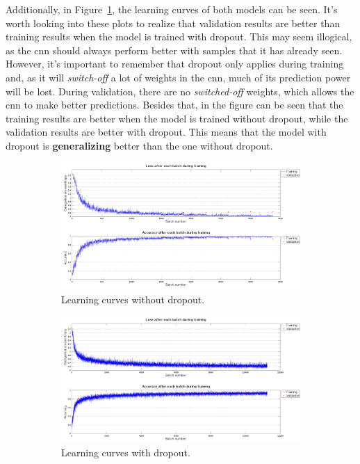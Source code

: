 Additionally, in Figure~\ref{fig:lc_dropout}, the learning curves of both models can be seen. It's worth looking into these plots to realize that validation results are better than training results when the model is trained with dropout. This may seem illogical, as the \gls{cnn} should always perform better with samples that it has already seen. However, it's important to remember that dropout only applies during training and, as it will \textit{switch-off} a lot of weights in the \gls{cnn}, much of its prediction power will be lost. During validation, there are no \textit{switched-off} weights, which allows the \gls{cnn} to make better predictions. Besides that, in the figure can be seen that the training results are better when the model is trained without dropout, while the validation results are better with dropout. This means that the model with dropout is \textbf{generalizing} better than the one without dropout. 
\begin{figure}
	\begin{subfigure}{1\textwidth}
		\centering
		\includegraphics[width=1\linewidth]{figures/lc_nodropout.png}
		\caption{Learning curves without dropout.}
	\end{subfigure}
	\begin{subfigure}{1\textwidth}
		\centering
		\includegraphics[width=1\linewidth]{figures/lc_dropout.png}
		\caption{Learning curves with dropout.}
	\end{subfigure}
	\caption[Learning curves with and without dropout.]{}
	\label{fig:lc_dropout}
\end{figure}

